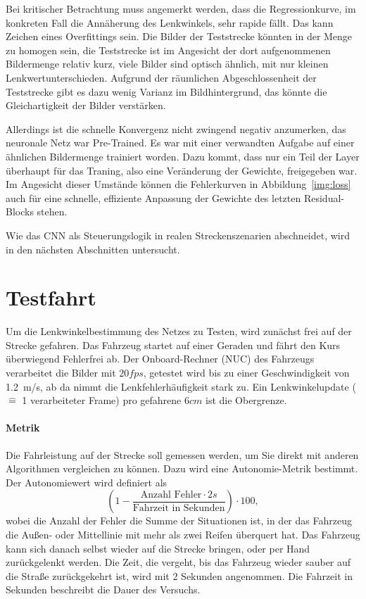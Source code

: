 Bei kritischer Betrachtung muss angemerkt werden, dass die Regressionkurve, im konkreten Fall die Annäherung des Lenkwinkels, sehr rapide fällt. Das kann Zeichen eines Overfittings sein. Die Bilder der Teststrecke könnten in der Menge zu homogen sein, die Teststrecke ist im Angesicht der dort aufgenommenen Bildermenge relativ kurz, viele Bilder sind optisch ähnlich, mit nur kleinen Lenkwertunterschieden. Aufgrund der räumlichen Abgeschlossenheit der Teststrecke gibt es dazu wenig Varianz im Bildhintergrund, das könnte die Gleichartigkeit der Bilder verstärken. 

Allerdings ist die schnelle Konvergenz nicht zwingend negativ anzumerken, das neuronale Netz war Pre-Trained. Es war mit einer verwandten Aufgabe auf einer ähnlichen Bildermenge trainiert worden. Dazu kommt, dass nur ein Teil der Layer überhaupt für das Traning, also eine Veränderung der Gewichte, freigegeben war. Im Angesicht dieser Umstände können die Fehlerkurven in Abbildung~\ref{img:loss} auch für eine schnelle, effiziente Anpassung der Gewichte des letzten Residual-Blocks stehen.

Wie das CNN als Steuerungslogik in realen Streckenszenarien abschneidet, wird in den nächsten Abschnitten untersucht.

\section{Testfahrt}

Um die Lenkwinkelbestimmung des Netzes zu Testen, wird zunächst frei auf der Strecke gefahren. Das Fahrzeug startet auf einer Geraden und fährt den Kurs überwiegend Fehlerfrei ab. Der Onboard-Rechner (NUC) des Fahrzeugs verarbeitet die Bilder mit $20 fps$, getestet wird bis zu einer Geschwindigkeit von \SI{1.2}{\meter/\second}, ab da nimmt die Lenkfehlerhäufigkeit stark zu. Ein Lenkwinkelupdate ($\widehat{=}$ 1 verarbeiteter Frame) pro gefahrene $6 cm$ ist die Obergrenze.

\paragraph{Metrik}
Die Fahrleistung auf der Strecke soll gemessen werden, um Sie direkt mit anderen Algorithmen vergleichen zu können. Dazu wird eine Autonomie-Metrik \cite{bojarski2016end} bestimmt. Der Autonomiewert wird definiert als 
\begin{equation}
\label{mat:autonomie}
(1 -  \frac{\text{Anzahl Fehler}\cdot 2 s}{\text{Fahrzeit in Sekunden}})\cdot 100,
\end{equation}
wobei die Anzahl der Fehler die Summe der Situationen ist, in der das Fahrzeug die Außen- oder Mittellinie mit mehr als zwei Reifen überquert hat. Das Fahrzeug kann sich danach selbst wieder auf die Strecke bringen, oder per Hand zurückgelenkt werden. Die Zeit, die vergeht, bis das Fahrzeug wieder sauber auf die Straße zurückgekehrt ist, wird mit 2 Sekunden angenommen. Die Fahrzeit in Sekunden beschreibt die Dauer des Versuchs.

